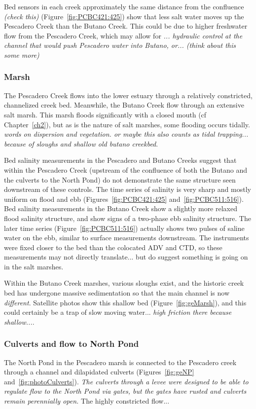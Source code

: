 Bed sensors in each creek approximately the same distance from the confluence \emph{(check this)} (Figure~\ref{fig:PCBC421:425}) show that less salt water moves up the Pescadero Creek than the Butano Creek. This could be due to higher freshwater flow from the Pescadero Creek, which may allow for \emph{... hydraulic control at the channel that would push Pescadero water into Butano, or... (think about this some more)} 

\subsubsection{Marsh}
The Pescadero Creek flows into the lower estuary through a relatively constricted, channelized creek bed.  Meanwhile, the Butano Creek flow through an extensive salt marsh. This marsh floods significantly with a closed mouth (cf Chapter~\ref{ch2}), but as is the nature of salt marshes, some flooding occurs tidally. \emph{words on dispersion and vegetation. or maybe this also counts as tidal trapping... because of sloughs and shallow old butano creekbed}. 

Bed salinity measurements in the Pescadero and Butano Creeks suggest that within the Pescadero Creek (upstream of the confluence of both the Butano and the culverts to the North Pond) do not demonstrate the same structure seen downstream of these controls. The time series of salinity is very sharp and mostly uniform on flood and ebb (Figures~\ref{fig:PCBC421:425} and~\ref{fig:PCBC511:516}). Bed salinity measurements in the Butano Creek show a slightly more relaxed flood salinity structure, and show signs of a two-phase ebb salinity structure. The later time series (Figure~\ref{fig:PCBC511:516}) actually shows two pulses of saline water on the ebb, similar to surface measurements downstream.  The instruments were fixed closer to the bed than the colocated ADV and CTD, so these measurements may not directly translate... but do suggest something is going on in the salt marshes.  

Within the Butano Creek marshes, various sloughs exist, and the historic creek bed has undergone massive sedimentation so that the main channel is now \emph{different}. Satellite photos show this shallow bed (Figure~\ref{fig:geMarsh}), and this could certainly be a trap of slow moving water... \emph{high friction there because shallow...}. 

\subsubsection{Culverts and flow to North Pond}
The North Pond in the Pescadero marsh is connected to the Pescadero creek through a channel and dilapidated culverts (Figures~\ref{fig:geNP} and~\ref{fig:photoCulverts}). \emph{The culverts through a levee were designed to be able to regulate flow to the North Pond via gates, but the gates have rusted and culverts remain perennially open.} The highly constricted flow... 

